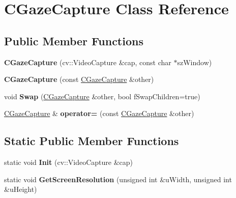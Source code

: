 \hypertarget{class_c_gaze_capture}{}\section{C\+Gaze\+Capture Class Reference}
\label{class_c_gaze_capture}
\subsection*{Public Member Functions}
\begin{DoxyCompactItemize}
\item 
\mbox{\label{class_c_gaze_capture_ad6c7d65869605992d64a9c52ae458ccf}} 
{\bfseries C\+Gaze\+Capture} (cv\+::\+Video\+Capture \&cap, const char $\ast$sz\+Window)
\item 
\mbox{\label{class_c_gaze_capture_aadb497c78141d331c0687ba7b9cf21f2}} 
{\bfseries C\+Gaze\+Capture} (const \hyperlink{class_c_gaze_capture}{C\+Gaze\+Capture} \&other)
\item 
\mbox{\label{class_c_gaze_capture_a28f96ebcf50365b96bbd3be84ede256e}} 
void {\bfseries Swap} (\hyperlink{class_c_gaze_capture}{C\+Gaze\+Capture} \&other, bool f\+Swap\+Children=true)
\item 
\mbox{\label{class_c_gaze_capture_a144457f3a900130378bce311b2aea02c}} 
\hyperlink{class_c_gaze_capture}{C\+Gaze\+Capture} \& {\bfseries operator=} (const \hyperlink{class_c_gaze_capture}{C\+Gaze\+Capture} \&other)
\end{DoxyCompactItemize}
\subsection*{Static Public Member Functions}
\begin{DoxyCompactItemize}
\item 
\mbox{\label{class_c_gaze_capture_a8686afa20893c8503c0cc400745d1093}} 
static void {\bfseries Init} (cv\+::\+Video\+Capture \&cap)
\item 
\mbox{\label{class_c_gaze_capture_ac70f160475539df0717eef31c8cdc0a6}} 
static void {\bfseries Get\+Screen\+Resolution} (unsigned int \&u\+Width, unsigned int \&u\+Height)
\end{DoxyCompactItemize}
